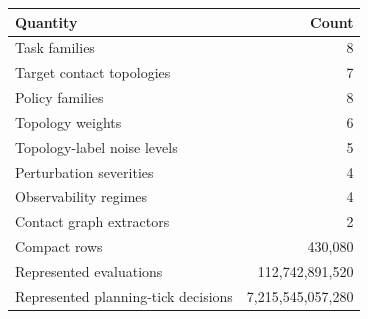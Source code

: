 \begin{tabular}{lr}
\toprule
Quantity & Count \\
\midrule
Task families & 8 \\
Target contact topologies & 7 \\
Policy families & 8 \\
Topology weights & 6 \\
Topology-label noise levels & 5 \\
Perturbation severities & 4 \\
Observability regimes & 4 \\
Contact graph extractors & 2 \\
Compact rows & 430,080 \\
Represented evaluations & 112,742,891,520 \\
Represented planning-tick decisions & 7,215,545,057,280 \\
\bottomrule
\end{tabular}
